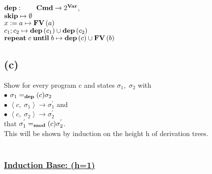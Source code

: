 \documentclass[12pt]{scrartcl}
\newcommand{\Mod}[0]{\text{\textbf{mod}}}
\newcommand{\dep}[0]{\text{\textbf{dep}}}
\begin{document}
	\indent\indent $\text{\textbf{dep}}: \qquad \text{\textbf{Cmd}}\rightarrow 2^{\text{\textbf{Var}}}$,\\
	\indent $\text{\textbf{skip}}\mapsto\emptyset$\\
	\indent $x:=a\mapsto \text{\textbf{FV}}\left( a\right)$\\
	\indent $c_1;c_2\mapsto \text{\textbf{dep}}\left( c_1\right) \cup\text{\textbf{dep}}\left( c_2\right)$\\
	\indent $\text{\textbf{repeat}}\; c\; \text{\textbf{until}}\; b \mapsto \text{\textbf{dep}}\left( c\right) \cup \text{\textbf{FV}}\left( b\right)$

	\subsection*{(c)}
	
	\indent\indent Show for every program c and states $\sigma_{1} ,\; \sigma_{2}$ with\\
	\indent\indent $\bullet$ \quad $\sigma_{1} =_\dep(c) \sigma_{2}$\\
	\indent\indent $\bullet$ \quad $\left\langle c,\; \sigma_{1} \right\rangle \rightarrow \sigma^{'}_{1}$ and\\
	\indent\indent $\bullet$ \quad $\left\langle c, \; \sigma_{2}\right\rangle \rightarrow \sigma^{'}_{2}$\\
	\indent that $\sigma^{'}_{1} =_\Mod(c)\sigma^{'}_{2}$.\\
	\indent This will be shown by induction on the height h of derivation trees.\\\\
	\subsubsection*{\underline{Induction Base: (h=1)}}
	
\end{document}
